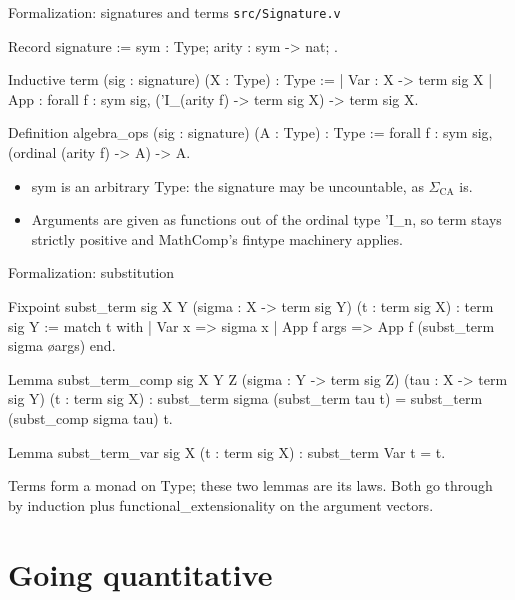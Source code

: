 \documentclass[10pt,aspectratio=169]{beamer}
\newcommand{\file}[1]{{\color{rocqcon}\texttt{#1}}}
\newcommand{\rid}[1]{{\ttfamily\small #1}}
\begin{document}
\begin{frame}[fragile]{Formalization: signatures and terms}
  \file{src/Signature.v}
  \begin{srcbox}
Record signature := {
  sym : Type;
  arity : sym -> nat;
}.

Inductive term (sig : signature) (X : Type) : Type :=
  | Var : X -> term sig X
  | App : forall f : sym sig, ('I_(arity f) -> term sig X) -> term sig X.

Definition algebra_ops (sig : signature) (A : Type) : Type :=
  forall f : sym sig, (ordinal (arity f) -> A) -> A.
  \end{srcbox}
  \begin{itemize}
    \item \rid{sym} is an arbitrary \rid{Type}: the signature may be
      uncountable, as $\Sigma_{\mathrm{CA}}$ is.
    \item Arguments are given as functions out of the ordinal type
      \rid{'I\_n}, so \rid{term} stays strictly positive and MathComp's
      \rid{fintype} machinery applies.
  \end{itemize}
\end{frame}

\begin{frame}[fragile]{Formalization: substitution}
  \begin{srcbox}
Fixpoint subst_term {sig X Y} (sigma : X -> term sig Y)
    (t : term sig X) : term sig Y :=
  match t with
  | Var x => sigma x
  | App f args => App f (subst_term sigma \o args)
  end.

Lemma subst_term_comp {sig X Y Z}
    (sigma : Y -> term sig Z) (tau : X -> term sig Y) (t : term sig X) :
  subst_term sigma (subst_term tau t) = subst_term (subst_comp sigma tau) t.

Lemma subst_term_var {sig X} (t : term sig X) :
  subst_term Var t = t.
  \end{srcbox}
  \vfill
  Terms form a monad on \rid{Type}; these two lemmas are its laws.
  Both go through by induction plus
  \rid{functional\_extensionality} on the argument vectors.
\end{frame}

\section{Going quantitative}
\end{document}
